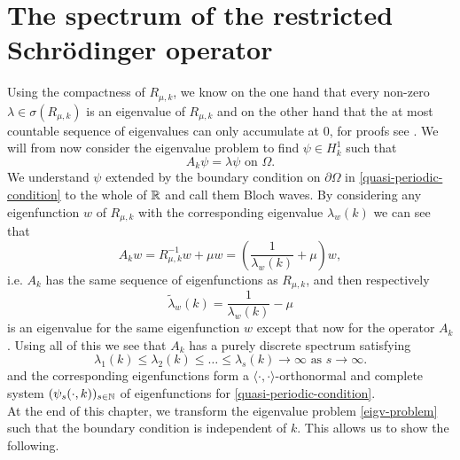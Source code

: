 \section{The spectrum of the restricted Schrödinger operator}
Using the compactness of $R_{\mu, k}$, we know on the one hand that every non-zero $\lambda \in \sigma(R_{\mu, k})$ is an eigenvalue of $R_{\mu, k}$ and on the other hand that the at most countable sequence of eigenvalues can only accumulate at $0$, for proofs see \cite[page 74 - 76]{WeisFA}. We will from now consider the eigenvalue problem to find $\psi \in H^{1}_{k}$ such that %
	\begin{equation}
		A_{k} \psi = \lambda \psi \text{ on } \Omega. \label{eigv-problem}
	\end{equation}
We understand $\psi$ extended by the boundary condition on $\partial \Omega$ in \eqref{quasi-periodic-condition} to the whole of $\mathbb{R}$ and call them Bloch waves. By considering any eigenfunction $w$ of $R_{\mu, k}$ with the corresponding eigenvalue $\lambda_{w}(k)$ we can see that
	\[ A_{k} w = R_{\mu, k}^{-1} w + \mu w = \left(\frac{1}{\lambda_{w}(k)} + \mu\right) w, \]
	i.e. $A_{k}$ has the same sequence of eigenfunctions as $R_{\mu, k}$, and then respectively
	\[ \tilde{\lambda}_{w}(k) = \frac{1}{\lambda_{w}(k)} - \mu \]
is an eigenvalue for the same eigenfunction $w$ except that now for the operator $A_{k}$. Using all of this we see that $A_{k}$ has a purely discrete spectrum satisfying
	\[ \lambda_{1}(k) \leq \lambda_{2}(k) \leq \dotsc \leq \lambda_{s}(k) \rightarrow \infty \text{ as } s \rightarrow \infty. \]
and the corresponding eigenfunctions form a $\langle \cdot , \cdot \rangle$-orthonormal and complete system $(\psi_{s}(\cdot, k))_{s \in \mathbb{N}}$ of eigenfunctions for \eqref{quasi-periodic-condition}. ~\\ %

At the end of this chapter, we transform the eigenvalue problem \eqref{eigv-problem} such that the boundary condition is independent of $k$. This allows us to show the following.

